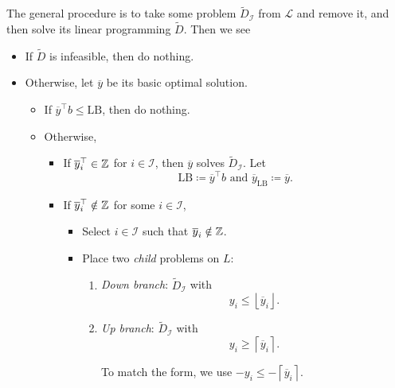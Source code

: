 The general procedure is to take some problem \(\widetilde{D}_{\mathcal{I}}\) from \(\mathcal{L}\) and remove it, and then solve
its linear programming \(\widetilde{D}\). Then we see
\begin{itemize}
	\item If \(\widetilde{D}\) is infeasible, then do nothing.
	\item Otherwise, let \(\overline{y}\) be its basic optimal solution.
	      \begin{itemize}
		      \item If \(\overline{y}^{\top}b\leq \mathrm{LB}\), then do nothing.
		      \item Otherwise,
		            \begin{itemize}
			            \item If \(\overline{y}^{\top}_i\in\mathbb{\MakeUppercase{Z}}\) for \(i\in \mathcal{I}\), then \(\overline{y}\) solves \(\widetilde{D}_{\mathcal{I}}\).
			                  Let
			                  \[
				                  \mathrm{LB} \coloneqq \overline{y}^{\top}b \text{ and } \overline{y}_{\mathrm{LB}}\coloneqq \overline{y}.
			                  \]
			            \item If \(\overline{y}^{\top}_{i}\notin \mathbb{\MakeUppercase{Z}}\) for some \(i\in \mathcal{I} \),
			                  \begin{itemize}
				                  \item Select \(i\in \mathcal{I} \) such that \(\overline{y}_{i}\notin \mathbb{\MakeUppercase{Z}}\).
				                  \item Place two \emph{child} problems on \(L\):

				                        \begin{enumerate}
					                        \item \emph{Down branch}: \(\widetilde{D}_{\mathcal{I}}\) with
					                              \[
						                              y_{i}\leq \left\lfloor \overline{y}_{i} \right\rfloor.
					                              \]
					                        \item \emph{Up branch}: \(\widetilde{D}_{\mathcal{I}}\) with
					                              \[
						                              y_{i}\geq \left\lceil \overline{y}_{i} \right\rceil.
					                              \]
					                              \begin{note}
						                              To match the form, we use \(-y_{i}\leq -\left\lceil \overline{y}_{i}\right\rceil\).
					                              \end{note}
				                        \end{enumerate}
			                  \end{itemize}
		            \end{itemize}
	      \end{itemize}
\end{itemize}

